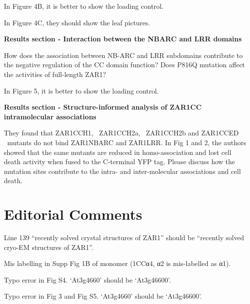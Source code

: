 \documentclass[10pt]{article}
\begin{document}
In Figure 4B, it is better to show the loading control.

In Figure 4C, they should show the leaf pictures.

\par\null

\textbf{Results section - Interaction between the NBARC and LRR domains}

How does the association between NB-ARC and LRR subdomains contribute to
the negative regulation of the CC domain function? Does P816Q mutation
affect the activities of full-length ZAR1?

In Figure 5, it is better to show the loading control.

\par\null

\textbf{Results section - Structure-informed analysis of ZAR1CC
intramolecular associations}

They found that ZAR1CCH1, ~ZAR1CCH2a, ~ZAR1CCH2b and ZAR1CCED ~mutants
do not bind ZAR1NBARC and ZAR1LRR. In Fig 1 and 2, the authors showed
that the same mutants are reduced in homo-association and lost cell
death activity when fused to the C-terminal YFP tag. Please discuss how
the mutation sites contribute to the intra- and inter-molecular
associations and cell death.

\section*{}

{\label{584260}}

\section*{Editorial Comments}

{\label{584260}}

Line 139 ``recently solved crystal structures of ZAR1'' should be
``recently solved cryo-EM structures of ZAR1''.

Mis labelling in Supp Fig 1B of monomer (1CCα4, α2 is mis-labelled as
α1).

Typo error in Fig S4. `At3g4660' should be `At3g46600'.

Typo error in Fig 3 and Fig S5. `At3g4660' should be `At3g46600'.

\par\null
\end{document}
